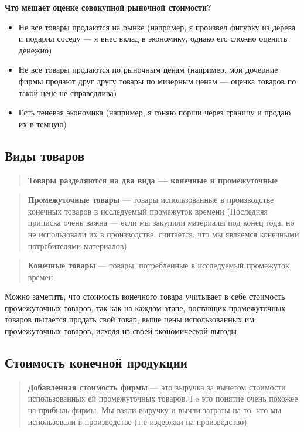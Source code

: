 \documentclass{article}
\begin{document}
    \textbf{Что мешает оценке совокупной рыночной стоимости?}
    \begin{itemize}
        \item Не все товары продаются на рынке (например, я произвел фигурку из дерева и подарил соседу --- я внес вклад в экономику, однако его сложно оценить денежно)
        \item Не все товары продаются по рыночным ценам (например, мои дочерние фирмы продают друг другу товары по мизерным ценам --- оценка товаров по такой цене не справедлива)
        \item Есть теневая экономика (например, я гоняю порши через границу и продаю их в темную)
    \end{itemize}

    \subsection{Виды товаров}

    \begin{quote}
        \textbf{Товары разделяются на два вида --- конечные и промежуточные}
    \end{quote}

    \begin{quote}
        \textbf{Промежуточные товары} --- товары использованные в производстве конечных товаров
        в исследуемый промежуток времени (Последняя приписка очень важна --- если мы закупили материалы
        под конец года, но не использовали их в производстве, считается, что мы являемся конечными потребителями
        материалов)
    \end{quote}

    \begin{quote}
        \textbf{Конечные товары} --- товары, потребленные в исследуемый промежуток времен
    \end{quote}

    Можно заметить, что стоимость конечного товара учитывает в себе стоимость промежуточных товаров, так как
    на каждом этапе, поставщик промежуточных товаров пытается продать свой товар, выше цены использованных им
    промежуточных товаров, исходя из своей экономической выгоды

    \subsection{Стоимость конечной продукции}

    \begin{quote}
        \textbf{Добавленная стоимость фирмы} --- это выручка за вычетом стоимости использованных ей промежуточных товаров. I.e
        это понятие очень похожее на прибыль фирмы. Мы взяли выручку и вычли затраты на то, что мы использовали в производстве (т.е издержки на
        производство)
    \end{quote}
\end{document}
